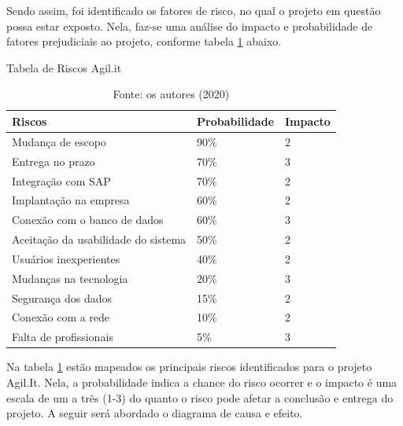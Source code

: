 {Sendo assim, foi identificado os fatores de risco, no qual o projeto em questão possa estar exposto. Nela, faz-se uma análise do impacto e probabilidade de fatores prejudiciais ao projeto, conforme tabela \ref{tebela_risco} abaixo.
\newpage
\begin{table}[]
	\caption{\label{tebela_risco} Tabela de Riscos Agil.it}
	\begin{tabular}{l|l|l}
		\hline
		\rowcolor[HTML]{EFEFEF} 
		\textbf{Riscos}                     & \textbf{Probabilidade} & \textbf{Impacto} \\ \hline
		\rowcolor[HTML]{DD7346} 
		Mudança de escopo                   & 90\%                   & 2                \\ \hline
		\rowcolor[HTML]{DD7346} 
		Entrega no prazo                    & 70\%                   & 3                \\ \hline
		\rowcolor[HTML]{DD7346} 
		Integração com SAP                  & 70\%                   & 2                \\ \hline
		\rowcolor[HTML]{FFFE65} 
		Implantação na empresa              & 60\%                   & 2                \\ \hline
		\rowcolor[HTML]{FFFE65} 
		Conexão com o banco de dados        & 60\%                   & 3                \\ \hline
		\rowcolor[HTML]{FFFE65} 
		Aceitação da usabilidade do sistema & 50\%                   & 2                \\ \hline
		\rowcolor[HTML]{FFFE65} 
		Usuários inexperientes              & 40\%                   & 2                \\ \hline
		\rowcolor[HTML]{9AFF99} 
		Mudanças na tecnologia              & 20\%                   & 3                \\ \hline
		\rowcolor[HTML]{9AFF99} 
		Segurança dos dados                 & 15\%                   & 2                \\ \hline
		\rowcolor[HTML]{9AFF99} 
		Conexão com a rede                  & 10\%                   & 2                \\ \hline
		\rowcolor[HTML]{9AFF99} 
		Falta de profissionais              & 5\%                    & 3                \\ \hline
	\end{tabular}
	\caption{Fonte: os autores (2020)}
\end{table}

Na tabela \ref{tebela_risco} estão mapeados os principais riscos identificados para o projeto Agil.It. Nela, a probabilidade indica a chance do risco ocorrer e o impacto é uma escala de um a três (1-3) do quanto o risco pode afetar a conclusão e entrega do projeto. A seguir será abordado o diagrama de causa e efeito.

}
